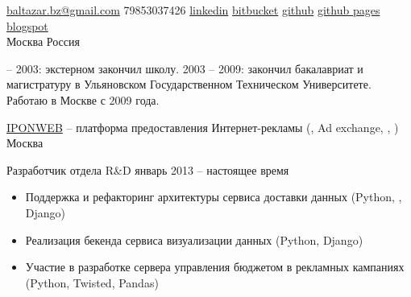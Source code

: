 \documentclass[unicode, 10pt, a4paper, oneside, fleqn]{article}
\begin{document}
\sloppy  %


\nobreakvspace{0.3em}  %

\noindent\href{mailto:baltazar.bz@gmail.com}{baltazar.bz\mbox{}@\mbox{}gmail.com}\sbull
\textsmaller{+}79853037426\sbull
\href{http://ru.linkedin.com/pub/yuri-bochkarev/21/3a9/555}{linkedin}
\sbull
\href{https://bitbucket.org/balta2ar}{bitbucket}
\sbull
\href{https://github.com/balta2ar}{github}
\sbull
\href{http://balta2ar.github.com}{github pages}
\sbull
\href{http://baltazar-bz.blogspot.com/}{blogspot}
\\
Москва\sbull
Россия


 -- 2003: экстерном закончил школу. 2003 -- 2009: закончил бакалавриат и
магистратуру в Ульяновском Государственном Техническом Университете. Работаю в
Москве с 2009 года.



\job  %
    {\href{http://www.iponweb.com}{IPONWEB} -- платформа предоставления
     Интернет-рекламы (, Ad exchange, , )}
    {Москва}
    {
        \position  %
            {Разработчик отдела R\&D}
            {январь 2013 -- настоящее время}
            {
                \begin{itemize}
                \item{Поддержка и рефакторинг архитектуры сервиса доставки
                      данных (Python, , Django)}
                \item{Реализация бекенда сервиса визуализации данных
                      (Python, Django)}
                \item{Участие в разработке сервера управления бюджетом в
                      рекламных кампаниях (Python, Twisted, Pandas)}
                \end{itemize}
            }
    }
\end{document}
